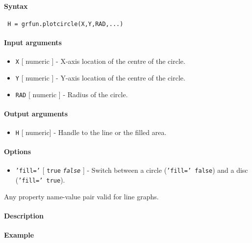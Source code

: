 


	\paragraph{Syntax}
 
 \begin{verbatim}
 H = grfun.plotcircle(X,Y,RAD,...)
 \end{verbatim}
 
 \paragraph{Input arguments}
 
 \begin{itemize}
 \item
   \texttt{X} {[} numeric {]} - X-axis location of the centre of the
   circle.
 \item
   \texttt{Y} {[} numeric {]} - Y-axis location of the centre of the
   circle.
 \item
   \texttt{RAD} {[} numeric {]} - Radius of the circle.
 \end{itemize}
 
 \paragraph{Output arguments}
 
 \begin{itemize}
 \item
   \texttt{H} {[} numeric{]} - Handle to the line or the filled area.
 \end{itemize}
 
 \paragraph{Options}
 
 \begin{itemize}
 \item
   \texttt{'fill='} {[} \texttt{true} \textbar{} \emph{\texttt{false}}
   {]} - Switch between a circle (\texttt{'fill=' false}) and a disc
   (\texttt{'fill=' true}).
 \end{itemize}
 
 Any property name-value pair valid for line graphs.
 
 \paragraph{Description}
 
 \paragraph{Example}


